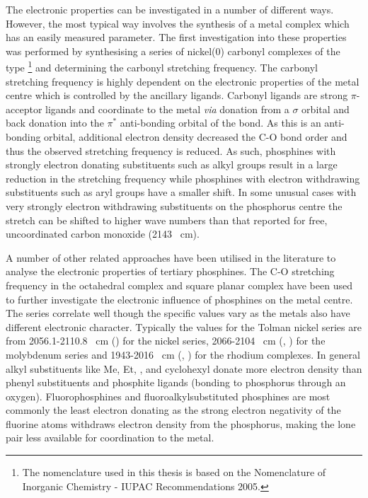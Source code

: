 The electronic properties can be investigated in a number of different ways.  However, the most typical way involves the synthesis of a metal complex which has an easily measured parameter.  The first investigation into these properties was performed by synthesising a series of nickel(0) carbonyl complexes of the type \ce{[Ni(CO)3L]}\footnote{The nomenclature used in this thesis is based on the Nomenclature of Inorganic Chemistry - IUPAC Recommendations 2005.\cite{IUPAC2005}}   and determining the carbonyl stretching frequency.\cite{Tolman1977}  The carbonyl stretching frequency is highly dependent on the electronic properties of the metal centre which is controlled by the ancillary ligands.  Carbonyl ligands are strong $\pi$-acceptor ligands and coordinate to the metal \emph{via} donation from a $\sigma$ orbital and back donation into the $\pi^*$ anti-bonding orbital of the  bond.  As this is an anti-bonding orbital, additional electron density decreased the C-O bond order and thus the observed stretching frequency is reduced.  As such, phosphines with strongly electron donating substituents such as alkyl groups result in a large reduction in the stretching frequency while phosphines with electron withdrawing substituents such as aryl groups have a smaller shift.   In some unusual cases with very strongly electron withdrawing substituents on the phosphorus centre the  stretch can be shifted to higher wave numbers than that reported for free, uncoordinated carbon monoxide (2143 \si{\per\cm}).\cite{Anderson2014}

A number of other related approaches have been utilised in the literature to analyse the electronic properties of tertiary phosphines.  The C-O stretching frequency in the octahedral \ce{[Mo(CO)5L]} complex and square planar \ce{Rh(CO)ClL2]} complex have been used to further investigate the electronic influence of phosphines on the metal centre.\cite{Banger2009}  The series correlate well though the specific values vary as the metals also have different electronic character.   Typically the values for the Tolman nickel series are from 2056.1-2110.8 \si{\per\cm} () for the nickel series, 2066-2104 \si{\per\cm} (, ) for the molybdenum series and 1943-2016 \si{\per\cm} (, ) for the rhodium complexes.  In general alkyl substituents like Me, Et, , \tBu{} and cyclohexyl donate more electron density than phenyl substituents and phosphite ligands (bonding to phosphorus through an oxygen).  Fluorophosphines and fluoroalkylsubstituted phosphines are most commonly the least electron donating as the strong electron negativity of the fluorine atoms withdraws electron density from the phosphorus, making the lone pair less available for coordination to the metal.  

